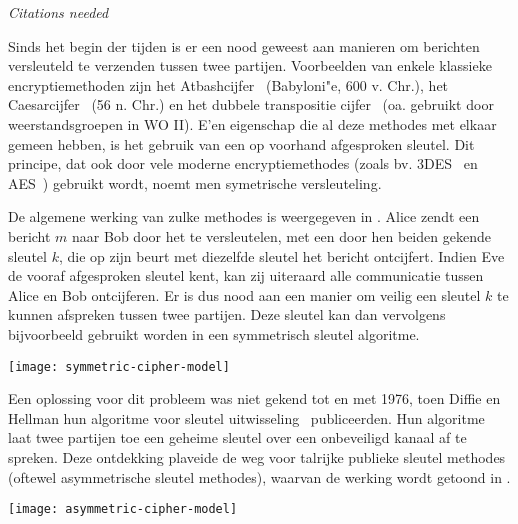 
\emph{Citations needed}

Sinds het begin der tijden is er een nood geweest aan manieren om berichten versleuteld te verzenden tussen twee partijen. Voorbeelden van enkele klassieke encryptiemethoden zijn het Atbashcijfer~\cite{atbash} (Babyloni"e, 600 v. Chr.), het Caesarcijfer~\cite{caesar} (56 n. Chr.) en het dubbele transpositie cijfer~\cite{double-transp} (oa. gebruikt door weerstandsgroepen in WO II). E'en eigenschap die al deze methodes met elkaar gemeen hebben, is het gebruik van een op voorhand afgesproken sleutel. Dit principe, dat ook door vele moderne encryptiemethodes (zoals bv. 3DES~\cite{3DES} en AES~\cite{AES}) gebruikt wordt, noemt men symetrische versleuteling.

De algemene werking van zulke methodes is weergegeven in . Alice zendt een bericht $m$ naar Bob door het te versleutelen, met een door hen beiden gekende sleutel $k$, die op zijn beurt met diezelfde sleutel het bericht ontcijfert. Indien Eve de vooraf afgesproken sleutel kent, kan zij uiteraard alle communicatie tussen Alice en Bob ontcijferen. Er is dus nood aan een manier om veilig een sleutel $k$ te kunnen afspreken tussen twee partijen. Deze sleutel kan dan vervolgens bijvoorbeeld gebruikt worden in een symmetrisch sleutel algoritme.

\vspace{\textfloatsep}
\begin{minipage}{\linewidth}
    \begin{center}
    \texttt{[image: symmetric-cipher-model]}
    \label{fig-encryptie-applicaties-sym-cipher}
    \end{center}
    \end{minipage}
\vspace{\textfloatsep}

Een oplossing voor dit probleem was niet gekend tot en met 1976, toen Diffie en Hellman hun algoritme voor sleutel uitwisseling~\cite{diffie-hellman} publiceerden. Hun algoritme laat twee partijen toe een geheime sleutel over een onbeveiligd kanaal af te spreken. Deze ontdekking plaveide de weg voor talrijke publieke sleutel methodes (oftewel asymmetrische sleutel methodes), waarvan de werking wordt getoond in .

\vspace{\textfloatsep}
\begin{minipage}{\linewidth}
    \begin{center}
    \texttt{[image: asymmetric-cipher-model]}
    \label{fig-encryptie-applicaties-asym-cipher}
    \end{center}
    \end{minipage}
\vspace{\textfloatsep}